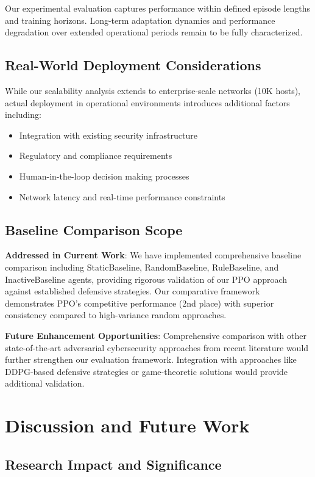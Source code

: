 \documentclass[12pt,twoside]{article}
\theoremstyle{definition}
\theoremstyle{plain}
\begin{document}
Our experimental evaluation captures performance within defined episode lengths and training horizons. Long-term adaptation dynamics and performance degradation over extended operational periods remain to be fully characterized.

\subsection{Real-World Deployment Considerations}

While our scalability analysis extends to enterprise-scale networks (10K hosts), actual deployment in operational environments introduces additional factors including:
\begin{itemize}
\item Integration with existing security infrastructure
\item Regulatory and compliance requirements
\item Human-in-the-loop decision making processes
\item Network latency and real-time performance constraints
\end{itemize}

\subsection{Baseline Comparison Scope}

\textbf{Addressed in Current Work}: We have implemented comprehensive baseline comparison including StaticBaseline, RandomBaseline, RuleBaseline, and InactiveBaseline agents, providing rigorous validation of our PPO approach against established defensive strategies. Our comparative framework demonstrates PPO's competitive performance (2nd place) with superior consistency compared to high-variance random approaches.

\textbf{Future Enhancement Opportunities}: Comprehensive comparison with other state-of-the-art adversarial cybersecurity approaches from recent literature would further strengthen our evaluation framework. Integration with approaches like DDPG-based defensive strategies or game-theoretic solutions would provide additional validation.

\section{Discussion and Future Work}

\subsection{Research Impact and Significance}
\end{document}
